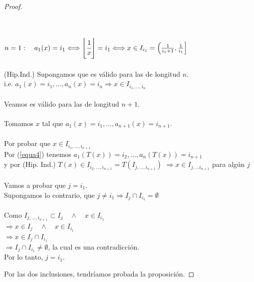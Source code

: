 \documentclass[12pt]{report}
\begin{document}
\begin{proof}
\begin{itemize}
    \\
    \\
    $n=1: \quad a_{1}(x)=i_{1} \Longleftrightarrow \left\lfloor\cfrac{1}{x}\right\rfloor=i_{1} \Longleftrightarrow x \in I_{i_{1}}=\left(\frac{1}{i_{1}+1}, \frac{1}{i_{1}}\right]$
    \\
    \\
    (Hip.Ind.) Supongamos que es válido para las de longitud $n$.
    \\
    i.e. $a_{1}(x)=i_{1}, \ldots, a_{n}(x)=i_{n} \Rightarrow x \in I_{i_{1}, \ldots, i_{n}}$
    \\
    \\
    Veamos es válido para las de longitud $n+1$.
    \\
    \\
    Tomamos $x$ tal que $a_{1}(x)=i_{1}, \ldots, a_{n+1}(x)=i_{n+1} .$
    \\
    \\
    Por probar que $x \in I_{i_{1}, \ldots, i_{n+1}}$
    \\
    Por (\ref{equa4}) tenemos $a_{1}(T(x))=i_{2}, \ldots, a_{n}(T(x))=i_{n+1}$
    \\
    y por (Hip. Ind.) $T(x) \in I_{i_{2}, \ldots, i_{n+1}}=T\left(I_{j, \ldots, i_{n+1}}\right)$
    $\Rightarrow x \in I_{j, \ldots i_{n+1}}$ para algún $j$
    \\
    \\
    Vamos a probar que $j=i_{1}$. \\
    Supongamos lo contrario, que $j \neq i_{1} \Rightarrow I_{j} \cap I_{i_{1}}=\emptyset$
    \\
    \\
    Como $ I_{j, \ldots, i_{n+1}}\subset I_{j} \quad \wedge \quad x \in I_{i_{1}}$
    \\
    $\Rightarrow x \in I_{j}\quad \wedge \quad x \in I_{i_{1}}$
    \\
    $\Rightarrow x\in I_{j}\cap I_{i_{1}}$
    \\
    $\Rightarrow I_{j}\cap I_{i_{1}}\neq\emptyset$, la cual es una contradicción.
    \\
    Por lo tanto, $j=i_{1}$.

\end{itemize}
Por las dos inclusiones, tendríamos probada la proposición. 
\end{proof}
\end{document}
